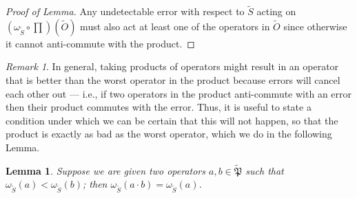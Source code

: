 \documentclass[12pt]{amsbook}
\theoremstyle{plain}
\newtheorem{lemma}{Lemma}
\theoremstyle{definition}
\theoremstyle{remark}
\newtheorem{remark}{Remark}
\newcommand{\set}{\tilde}
\newcommand{\pauligroup}{{\set{\mathfrak{P}}}}
\newcommand{\om}{\omega}
\begin{document}
\begin{proof}[Proof of Lemma]
Any undetectable error with respect to $\set S$ acting on $(\om_{\set S}\circ \prod)(\set O)$ must also act at least one of the operators in $\set O$ since otherwise it cannot anti-commute with the product. \end{proof}
\begin{remark}
In general, taking products of operators might result in an operator that is better than the worst operator in the product because errors will cancel each other out --- i.e., if two operators in the product anti-commute with an error then their product commutes with the error.  Thus, it is useful to state a condition under which we can be certain that this will not happen, so that the product is exactly as bad as the worst operator, which we do in the following Lemma.
\end{remark}

\begin{lemma}
\label{lesser-operator-wins}
Suppose we are given two operators $a,b\in\pauligroup$ such that $\om_{\set S}(a)<\om_{\set S}(b)$;  then $\om_{\set S}(a\cdot b) = \om_{\set S}(a)$.
\end{lemma}
\end{document}
